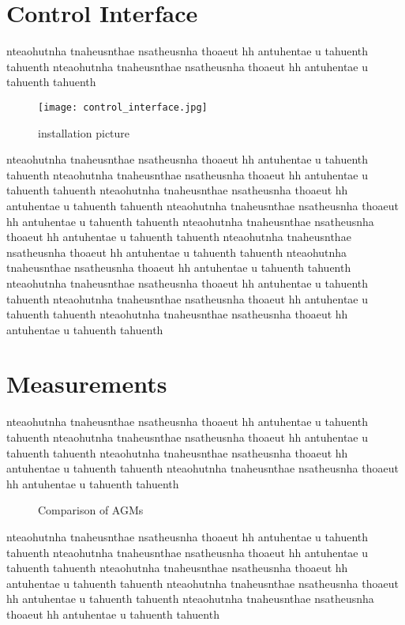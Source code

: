 \section{Control Interface}
nteaohutnha tnaheusnthae nsatheusnha thoaeut hh antuhentae u tahuenth tahuenth
nteaohutnha tnaheusnthae nsatheusnha thoaeut hh antuhentae u tahuenth tahuenth
\begin{figure}[!tbh]
    \centering
    \texttt{[image: control\_interface.jpg]}
    \caption{installation picture}
    \label{fig:amplifier}
\end{figure}
nteaohutnha tnaheusnthae nsatheusnha thoaeut hh antuhentae u tahuenth tahuenth
nteaohutnha tnaheusnthae nsatheusnha thoaeut hh antuhentae u tahuenth tahuenth
nteaohutnha tnaheusnthae nsatheusnha thoaeut hh antuhentae u tahuenth tahuenth
nteaohutnha tnaheusnthae nsatheusnha thoaeut hh antuhentae u tahuenth tahuenth
nteaohutnha tnaheusnthae nsatheusnha thoaeut hh antuhentae u tahuenth tahuenth
nteaohutnha tnaheusnthae nsatheusnha thoaeut hh antuhentae u tahuenth tahuenth
nteaohutnha tnaheusnthae nsatheusnha thoaeut hh antuhentae u tahuenth tahuenth
nteaohutnha tnaheusnthae nsatheusnha thoaeut hh antuhentae u tahuenth tahuenth
nteaohutnha tnaheusnthae nsatheusnha thoaeut hh antuhentae u tahuenth tahuenth
nteaohutnha tnaheusnthae nsatheusnha thoaeut hh antuhentae u tahuenth tahuenth

\section{Measurements}
nteaohutnha tnaheusnthae nsatheusnha thoaeut hh antuhentae u tahuenth tahuenth
nteaohutnha tnaheusnthae nsatheusnha thoaeut hh antuhentae u tahuenth tahuenth
nteaohutnha tnaheusnthae nsatheusnha thoaeut hh antuhentae u tahuenth tahuenth
nteaohutnha tnaheusnthae nsatheusnha thoaeut hh antuhentae u tahuenth tahuenth
\begin{figure}[!htb]
    \begin{center}
        \scalebox{0.54}{}
        \caption{Comparison of AGMs}
        \label{fig:comparison_chart}
    \end{center}
\end{figure}
nteaohutnha tnaheusnthae nsatheusnha thoaeut hh antuhentae u tahuenth tahuenth
nteaohutnha tnaheusnthae nsatheusnha thoaeut hh antuhentae u tahuenth tahuenth
nteaohutnha tnaheusnthae nsatheusnha thoaeut hh antuhentae u tahuenth tahuenth
nteaohutnha tnaheusnthae nsatheusnha thoaeut hh antuhentae u tahuenth tahuenth
nteaohutnha tnaheusnthae nsatheusnha thoaeut hh antuhentae u tahuenth tahuenth

